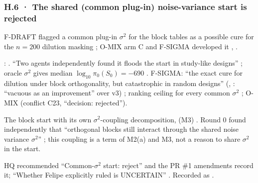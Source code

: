 \subsubsection*{H.6 · The shared (common plug-in) noise-variance start is rejected}
\begin{description}[leftmargin=1.3em,style=unboxed,font=\normalfont]
\item[\textbf{Claim.}] F-DRAFT flagged a common plug-in $\sigma^2$ for the block tables as a possible cure for the $n=200$ dilution masking ; O-MIX arm C and F-SIGMA developed it , .
\item[\textbf{Failed.}] :  . ``Two agents independently found it floods the start in study-like designs'' ; oracle $\sigma^2$ gives median $\log_{10}\pi_0(S_0)=-690$ . F-SIGMA: ``the exact cure for dilution under block orthogonality, but catastrophic in random designs'' (, : ``vacuous as an improvement'' over v3) ; ranking ceiling for every common $\sigma^2$ ; O-MIX  (conflict C23, ``decision: rejected'').
\item[\textbf{Replacement.}] The block start with its own $\sigma^2$-coupling decomposition,  (M3) . Round 0 found independently that ``orthogonal blocks still interact through the shared noise variance $\sigma^2$'' ; this coupling is a term of M2(a) and M3, not a reason to share $\sigma^2$ in the start.
\end{description}
\begin{uncertain}
HQ recommended ``Common-$\sigma^2$ start: reject''  and the PR \#1 amendments record it; ``Whether Felipe explicitly ruled is UNCERTAIN'' . Recorded as .
\end{uncertain}

